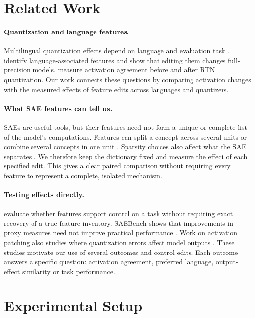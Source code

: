 \documentclass[11pt]{article}
\begin{document}
\section{Related Work}
\paragraph{Quantization and language features.}
Multilingual quantization effects depend on language and evaluation task \citep{marchisio-etal-2024-quantization}. \citet{deng-etal-2025-unveiling} identify language-associated features and show that editing them changes full-precision models. \citet{duan2026} measure activation agreement before and after RTN quantization. Our work connects these questions by comparing activation changes with the measured effects of feature edits across languages and quantizers.

\paragraph{What SAE features can tell us.}
SAEs are useful tools, but their features need not form a unique or complete list of the model's computations. Features can split a concept across several units or combine several concepts in one unit \citep{leask2025canonical}. Sparsity choices also affect what the SAE separates \citep{chanin2026sparse}. We therefore keep the dictionary fixed and measure the effect of each specified edit. This gives a clear paired comparison without requiring every feature to represent a complete, isolated mechanism.

\paragraph{Testing effects directly.}
\citet{makelov2025principled} evaluate whether features support control on a task without requiring exact recovery of a true feature inventory. SAEBench shows that improvements in proxy measures need not improve practical performance \citep{karvonen2025saebench}. Work on activation patching also studies where quantization errors affect model outputs \citep{chang-etal-2025-inputs}. These studies motivate our use of several outcomes and control edits. Each outcome answers a specific question: activation agreement, preferred language, output-effect similarity or task performance.

\section{Experimental Setup}
\end{document}
